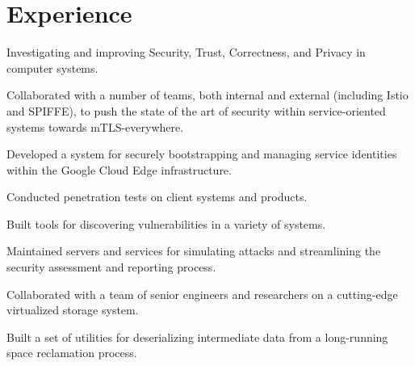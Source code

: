 \documentclass{resume}
\begin{document}
\hfill
\begin{minipage}[t]{0.66\textwidth}


\section{Experience}

\vspace{1.25\topsep} %
\begin{tightemize}
\item Investigating and improving Security, Trust, Correctness, and Privacy in computer systems.
\end{tightemize}
\sectionsep

\begin{tightemize}
\item Collaborated with a number of teams, both internal and external (including Istio and SPIFFE), to push the state of the art of security within service-oriented systems towards mTLS-everywhere.
\item Developed a system for securely bootstrapping and managing service identities within the Google Cloud Edge infrastructure.
\end{tightemize}
\sectionsep

\begin{tightemize}
\item Conducted penetration tests on client systems and products.
\item Built tools for discovering vulnerabilities in a variety of systems.
\item Maintained servers and services for simulating attacks and streamlining the security assessment and reporting process.
\end{tightemize}
\sectionsep

\begin{tightemize}
\item Collaborated with a team of senior engineers and researchers on a cutting-edge virtualized storage system.
\item Built a set of utilities for deserializing intermediate data from a long-running space reclamation process.
\end{tightemize}
\sectionsep


\end{minipage}
\end{document}
